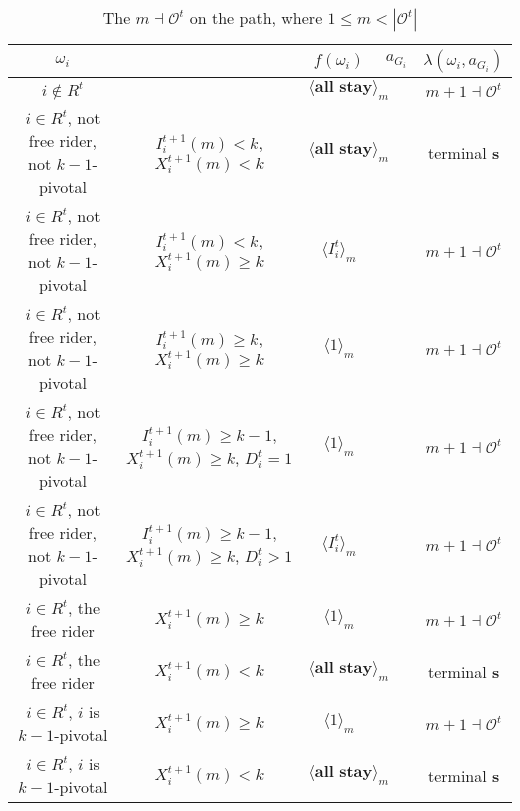 \documentclass[12pt,letter]{article}
\newcommand{\Omicron}{\mathcal{O}}
\theoremstyle{definition}
\theoremstyle{remark}
\theoremstyle{claim}
\begin{document}
\begin{landscape}
\begin{table}[!htbp]
\caption{The $m\dashv\Omicron^t$ on the path, where $1\leq m < |\Omicron^t|$}
\label{table:eqm_path_ot1}
\begin{center}
\begin{tabular}{c c | c | c | c}
$\omega_i$ 	 & 	   &	$f(\omega_i)$  &	$a_{G_i}$ & $\lambda(\omega_i,a_{G_i})$ \\
\hline
\hline
$i\notin R^t$  	& 								& $\langle \textbf{all stay} \rangle_m$		&  			& $m+1\dashv \Omicron^t$ \\
$i\in R^t$, not free rider, not $k-1$-pivotal		 	&  $I^{t+1}_i(m)< k$, $X^{t+1}_i(m)<k$			&  $\langle \textbf{all stay} \rangle_m$	& 	& terminal \textbf{s} \\
$i\in R^t$, not free rider, not $k-1$-pivotal	  	& $I^{t+1}_i(m)<k$, $X^{t+1}_i(m)\geq k$		    & $\langle I^t_i \rangle_m$ 		&    			& $m+1\dashv \Omicron^t$ \\
$i\in R^t$, not free rider, not $k-1$-pivotal	 	&  $I^{t+1}_i(m)\geq k$, $X^{t+1}_i(m)\geq k$	& $\langle 1 \rangle_m$ 	& 	& $m+1\dashv \Omicron^t$ \\
$i\in R^t$, not free rider, not $k-1$-pivotal	 	&  $I^{t+1}_i(m)\geq k-1$, $X^{t+1}_i(m)\geq k$, $D^t_i=1$	& $\langle 1 \rangle_m$ 	& 	& $m+1\dashv \Omicron^t$ \\
$i\in R^t$, not free rider, not $k-1$-pivotal	 	&  $I^{t+1}_i(m)\geq k-1$, $X^{t+1}_i(m)\geq k$, $D^t_i>1$	& $\langle I^t_i \rangle_m$ 	& 	& $m+1\dashv \Omicron^t$ \\
$i\in R^t$, the free rider  	&  $X^{t+1}_i(m)\geq k$ & $\langle 1 \rangle_m$ 		& 				  & $m+1\dashv \Omicron^t$ \\
$i\in R^t$, the free rider  	&  		$X^{t+1}_i(m)<k$					&  $\langle \textbf{all stay} \rangle_m$		& 										  & terminal \textbf{s} \\
$i\in R^t$, $i$ is $k-1$-pivotal  	&  $X^{t+1}_i(m)\geq k$ & $\langle 1 \rangle_m$ 	& 											 & $m+1\dashv \Omicron^t$ \\
$i\in R^t$, $i$ is $k-1$-pivotal  	&  	$X^{t+1}_i(m)<k$		&  $\langle \textbf{all stay} \rangle_m$	& 											 & terminal \textbf{s} \\
\hline
\end{tabular}
\end{center}
\end{table}


\end{landscape}
\end{document}
